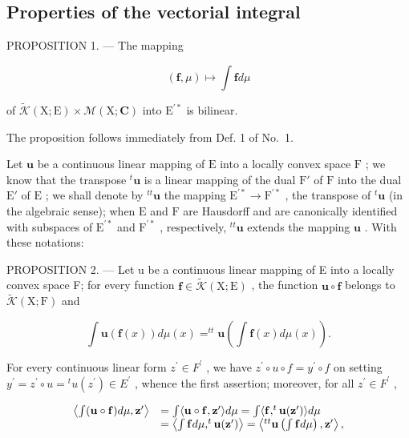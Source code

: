 \subsection{Properties of the vectorial integral}

PROPOSITION 1. --- The mapping

\[
(\mathbf {f}, \mu) \mapsto \int \mathbf {f} d \mu
\]

of \(\widetilde{\mathcal{K}} (\mathrm{X};\mathrm{E})\times \mathcal{M}(\mathrm{X};\mathbf{C})\) into \(\mathrm{E}^{\prime *}\) is bilinear.

The proposition follows immediately from Def. 1 of No.~1.

Let \(\mathbf{u}\) be a continuous linear mapping of \(\mathrm{E}\) into a locally convex space \(\mathrm{F}\) ; we know that the transpose \(^t\mathbf{u}\) is a linear mapping of the dual \(\mathrm{F}'\) of \(\mathrm{F}\) into the dual \(\mathrm{E}'\) of \(\mathrm{E}\) ; we shall denote by \(^{tt}\mathbf{u}\) the mapping \(\mathrm{E}^{\prime *} \to \mathrm{F}^{\prime *}\) , the transpose of \(^t\mathbf{u}\) (in the algebraic sense); when \(\mathrm{E}\) and \(\mathrm{F}\) are Hausdorff and are canonically identified with subspaces of \(\mathrm{E}^{\prime *}\) and \(\mathrm{F}^{\prime *}\) , respectively, \(^{tt}\mathbf{u}\) extends the mapping \(\mathbf{u}\) . With these notations:

PROPOSITION 2. --- Let u be a continuous linear mapping of E into a locally convex space F; for every function \(\mathbf{f} \in \widetilde{\mathcal{K}}(\mathrm{X};\mathrm{E})\) , the function \(\mathbf{u} \circ \mathbf{f}\) belongs to \(\widetilde{\mathcal{K}}(\mathrm{X};\mathrm{F})\) and

\[
\int \mathbf {u} (\mathbf {f} (x)) d \mu (x) = ^ {t t} \mathbf {u} \left(\int \mathbf {f} (x) d \mu (x)\right).\tag{2}
\]

For every continuous linear form \(z^{\prime} \in F^{\prime}\) , we have \(z^{\prime} \circ u \circ f = y^{\prime} \circ f\) on setting \(y^{\prime} = z^{\prime} \circ u = {}^{t}u(z^{\prime}) \in E^{\prime}\) , whence the first assertion; moreover, for all \(z^{\prime} \in F^{\prime}\) ,

\[
\begin{array}{r l} \left\langle \int (\mathbf {u} \circ \mathbf {f}) d \mu , \mathbf {z} ^ {\prime} \right\rangle & = \int \langle \mathbf {u} \circ \mathbf {f}, \mathbf {z} ^ {\prime} \rangle d \mu = \int \langle \mathbf {f}, ^ {t} \mathbf {u} (\mathbf {z} ^ {\prime}) \rangle d \mu \\ & = \left\langle \int \mathbf {f} d \mu , ^ {t} \mathbf {u} (\mathbf {z} ^ {\prime}) \right\rangle = \left\langle {} ^ {t t} \mathbf {u} \left(\int \mathbf {f} d \mu\right), \mathbf {z} ^ {\prime} \right\rangle , \end{array}
\]

